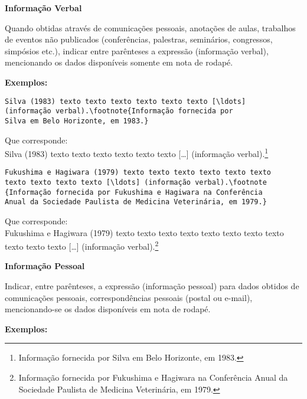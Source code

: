 \textbf{Informação Verbal}

Quando obtidas através de comunicações pessoais, anotações de aulas, trabalhos de eventos não publicados (conferências, palestras, seminários, congressos, simpósios etc.), indicar entre parênteses a expressão (informação verbal), mencionando os dados disponíveis somente em nota de rodapé.

\textbf{Exemplos:}

\begin{alineas}
\item
\begin{verbatim}
Silva (1983) texto texto texto texto texto texto [\ldots] 
(informação verbal).\footnote{Informação fornecida por 
Silva em Belo Horizonte, em 1983.}
\end{verbatim}
Que corresponde:\\
Silva (1983) texto texto texto texto texto texto [\ldots] (informação verbal).\footnote{Informação fornecida por Silva em Belo Horizonte, em 1983.} \\
\item
\begin{verbatim}
Fukushima e Hagiwara (1979) texto texto texto texto texto texto 
texto texto texto texto [\ldots] (informação verbal).\footnote
{Informação fornecida por Fukushima e Hagiwara na Conferência 
Anual da Sociedade Paulista de Medicina Veterinária, em 1979.}
\end{verbatim}
Que corresponde: \\
Fukushima e Hagiwara (1979) texto texto texto texto texto texto texto texto texto texto texto [\ldots] (informação verbal).\footnote{Informação fornecida por Fukushima e Hagiwara na Conferência Anual da Sociedade Paulista de Medicina Veterinária, em 1979.}\\
\end{alineas}

\textbf{Informação Pessoal}

Indicar, entre parênteses, a expressão (informação pessoal) para dados obtidos de comunicações pessoais, correspondências pessoais (postal ou e-mail), mencionando-se os dados disponíveis em nota de rodapé.

\textbf{Exemplos:}


